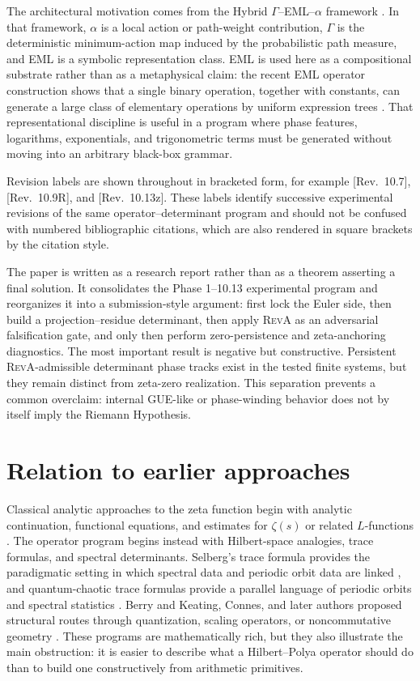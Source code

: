 \documentclass[11pt]{article}
\newcommand{\RevA}{\textsc{RevA}}
\newcommand{\revtag}[1]{\textnormal{[Rev.~#1]}}
\theoremstyle{definition}
\theoremstyle{plain}
\begin{document}
The architectural motivation comes from the Hybrid $\Gamma$--EML--$\alpha$ framework \citep{JoseHybridGammaEMLAlpha2026}.  In that framework, $\alpha$ is a local action or path-weight contribution, $\Gamma$ is the deterministic minimum-action map induced by the probabilistic path measure, and EML is a symbolic representation class.  EML is used here as a compositional substrate rather than as a metaphysical claim: the recent EML operator construction shows that a single binary operation, together with constants, can generate a large class of elementary operations by uniform expression trees \citep{Odrzywolek2026}.  That representational discipline is useful in a program where phase features, logarithms, exponentials, and trigonometric terms must be generated without moving into an arbitrary black-box grammar.

Revision labels are shown throughout in bracketed form, for example 
\revtag{10.7}, 
\revtag{10.9R}, and 
\revtag{10.13z}.  These labels identify successive experimental revisions of the same operator--determinant program and should not be confused with numbered bibliographic citations, which are also rendered in square brackets by the citation style.

The paper is written as a research report rather than as a theorem asserting a final solution.  It consolidates the Phase 1--10.13 experimental program and reorganizes it into a submission-style argument: first lock the Euler side, then build a projection--residue determinant, then apply \RevA{} as an adversarial falsification gate, and only then perform zero-persistence and zeta-anchoring diagnostics.  The most important result is negative but constructive.  Persistent \RevA-admissible determinant phase tracks exist in the tested finite systems, but they remain distinct from zeta-zero realization.  This separation prevents a common overclaim: internal GUE-like or phase-winding behavior does not by itself imply the Riemann Hypothesis.

\section{Relation to earlier approaches}

Classical analytic approaches to the zeta function begin with analytic continuation, functional equations, and estimates for $\zeta(s)$ or related $L$-functions \citep{Edwards1974,Titchmarsh1986,Ivic1985}.  The operator program begins instead with Hilbert-space analogies, trace formulas, and spectral determinants.  Selberg's trace formula provides the paradigmatic setting in which spectral data and periodic orbit data are linked \citep{Selberg1956}, and quantum-chaotic trace formulas provide a parallel language of periodic orbits and spectral statistics \citep{Gutzwiller1990}.  Berry and Keating, Connes, and later authors proposed structural routes through quantization, scaling operators, or noncommutative geometry \citep{BerryKeating1999,Connes1999,Berry1985}.  These programs are mathematically rich, but they also illustrate the main obstruction: it is easier to describe what a Hilbert--Polya operator should do than to build one constructively from arithmetic primitives.
\end{document}
